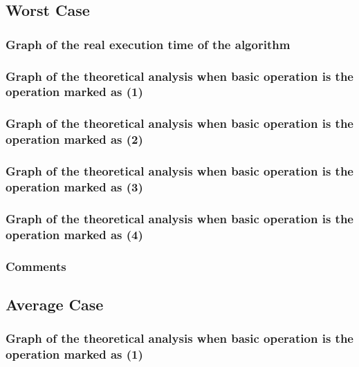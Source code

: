 \documentclass[11pt, oneside, a4paper]{article}
\begin{document}
	\subsection{Worst Case}

	\subsubsection{Graph of the real execution time of the algorithm}

	\subsubsection{Graph of the theoretical analysis when basic operation is the operation marked as (1)}

	\subsubsection{Graph of the theoretical analysis when basic operation is the operation marked as (2)}

	\subsubsection{Graph of the theoretical analysis when basic operation is the operation marked as (3)}

	\subsubsection{Graph of the theoretical analysis when basic operation is the operation marked as (4)}

	\subsubsection{Comments}




	\subsection{Average Case}

	
	\subsubsection{Graph of the theoretical analysis when basic operation is the operation marked as (1)}
\end{document}
